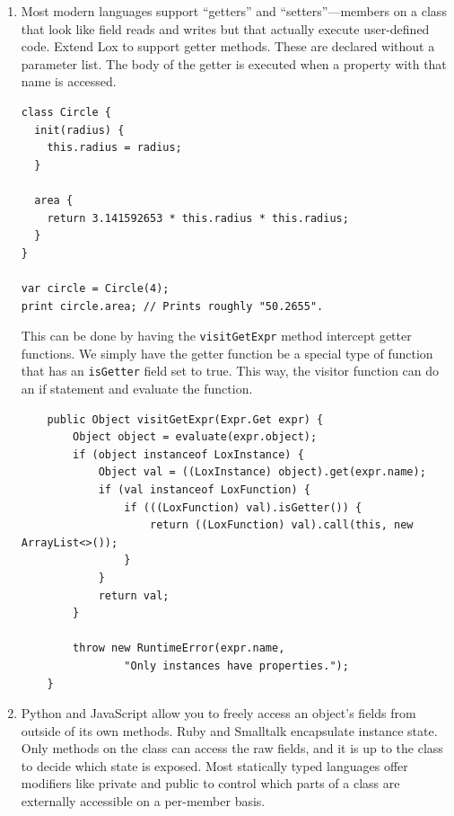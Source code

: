 \documentclass{article}
\begin{document}
\begin{enumerate}
{        This alows for the \verb|LoxInstance| object to resolve the static methods.
    }

    \item {
        Most modern languages support “getters” and “setters”—members on a class that look like field reads and writes but that actually execute user-defined code. Extend Lox to support getter methods. These are declared without a parameter list. The body of the getter is executed when a property with that name is accessed.

        \begin{verbatim}
class Circle {
  init(radius) {
    this.radius = radius;
  }

  area {
    return 3.141592653 * this.radius * this.radius;
  }
}

var circle = Circle(4);
print circle.area; // Prints roughly "50.2655".
        \end{verbatim}

        This can be done by having the \verb|visitGetExpr| method intercept 
        getter functions. We simply have the getter function be a special type of 
        function that has an \verb|isGetter| field set to true. This way, 
        the visitor function can do an if statement and evaluate the function.

        \begin{verbatim}
    public Object visitGetExpr(Expr.Get expr) {
        Object object = evaluate(expr.object);
        if (object instanceof LoxInstance) {
            Object val = ((LoxInstance) object).get(expr.name);
            if (val instanceof LoxFunction) {
                if (((LoxFunction) val).isGetter()) {
                    return ((LoxFunction) val).call(this, new ArrayList<>());
                }
            }
            return val;
        }

        throw new RuntimeError(expr.name,
                "Only instances have properties.");
    }
        \end{verbatim}
    }

    \item {
        Python and JavaScript allow you to freely access an object’s fields from outside of its own methods. Ruby and Smalltalk encapsulate instance state. Only methods on the class can access the raw fields, and it is up to the class to decide which state is exposed. Most statically typed languages offer modifiers like private and public to control which parts of a class are externally accessible on a per-member basis.

}
\end{enumerate}
\end{document}
